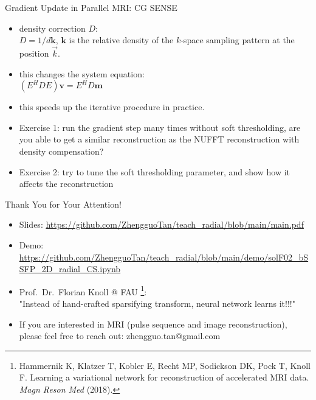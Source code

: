 \begin{frame}{Gradient Update in Parallel MRI: CG SENSE}

	\begin{itemize}
		\item density correction $D$:\\
		$D = 1 / d \mathbf{k}$, $\mathbf{k}$ is the relative density of the $k$-space sampling pattern at the position $\vec{k}$.
		\vspace{2em}
		\item this changes the system equation:\\
		$(E^H D E) \mathbf{v} = E^H D \mathbf{m}$
		\vspace{2em}
		\item <2-> this speeds up the iterative procedure in practice.
		\vspace{1em}
		\item <3-> Exercise 1: run the gradient step many times without soft thresholding, are you able to get a similar reconstruction as the NUFFT reconstruction with density compensation?
		\vspace{1em}
		\item <4-> Exercise 2: try to tune the soft thresholding parameter, and show how it affects the reconstruction

	\end{itemize}

\end{frame}




\begin{frame}{Thank You for Your Attention!}
    \begin{itemize}
    	\item Slides: \url{https://github.com/ZhengguoTan/teach_radial/blob/main/main.pdf}
    	\vspace{0.5em}
    	\item Demo: \url{https://github.com/ZhengguoTan/teach_radial/blob/main/demo/solF02_bSSFP_2D_radial_CS.ipynb}
    	\vspace{1em}
    	\item Prof.~Dr.~Florian Knoll @ FAU \footnote{Hammernik K, Klatzer T, Kobler E, Recht MP, Sodickson DK, Pock T, Knoll F. Learning a variational network for reconstruction of accelerated MRI data. \textit{Magn Reson Med} (2018).}:\\
    	 		"Instead of hand-crafted sparsifying transform, neural network learns it!!!"
    	 \vspace{1em}
        \item If you are interested in MRI (pulse sequence and image reconstruction), please feel free to reach out: zhengguo.tan@gmail.com
    \end{itemize}
\end{frame}